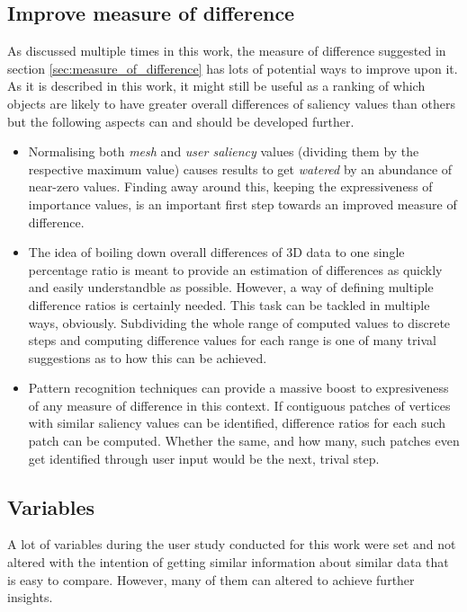 	\subsection{Improve measure of difference}
	\label{sec:improve_mod}
As discussed multiple times in this work, the measure of difference suggested in section \ref{sec:measure_of_difference} has lots of potential ways to improve upon it. As it is described in this work, it might still be useful as a ranking of which objects are likely to have greater overall differences of saliency values than others but the following aspects can and should be developed further.

\begin{itemize}
	\item Normalising both \textit{mesh} and \textit{user saliency} values (dividing them by the respective maximum value) causes results to get \textit{watered} by an abundance of near-zero values. Finding away around this, keeping the expressiveness of importance values, is an important first step towards an improved measure of difference.
	\item The idea of boiling down overall differences of 3D data to one single percentage ratio is meant to provide an estimation of differences as quickly and easily understandble as possible. However, a way of defining multiple difference ratios is certainly needed. This task can be tackled in multiple ways, obviously. Subdividing the whole range of computed values to discrete steps and computing difference values for each range is one of many trival suggestions as to how this can be achieved.
	\item Pattern recognition techniques can provide a massive boost to expresiveness of any measure of difference in this context. If contiguous patches of vertices with similar saliency values can be identified, difference ratios for each such patch can be computed. Whether the same, and how many, such patches even get identified through user input would be the next, trival step.
\end{itemize}

	\subsection{Variables}
	\label{sec:variables}
A lot of variables during the user study conducted for this work were set and not altered with the intention of getting similar information about similar data that is easy to compare. However, many of them can altered to achieve further insights.

